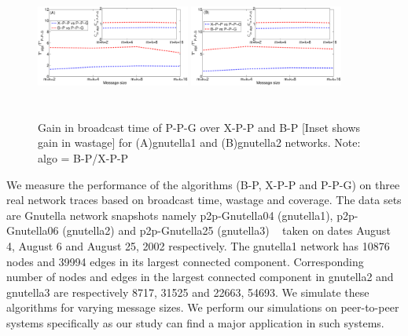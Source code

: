 \begin{figure}[!ht]
  \centering	
 \includegraphics*[width=0.45\textwidth,height=40mm,angle=0]{./texfiles/Chapter_3/netsci/figs1/comp_gnut_4.eps}
 \includegraphics*[width=0.45\textwidth,height=40mm,angle=0]{./texfiles/Chapter_3/netsci/figs1/comp_gnut_6.eps}
 
 \caption{\label{gnutellacomp1} Gain in broadcast time of P-P-G over X-P-P and B-P [Inset shows gain in wastage] for (A)gnutella1 and (B)gnutella2 networks. Note: algo = B-P/X-P-P }
\end{figure}
%  

We measure 
the performance of the algorithms (B-P, X-P-P and P-P-G) on three real network traces based on broadcast time, 
wastage and coverage. The data sets are Gnutella network snapshots namely 
p2p-Gnutella04 (gnutella1), p2p-Gnutella06 (gnutella2) and p2p-Gnutella25 (gnutella3) ~\cite{leskovec2007graph,ripeanu2002mapping} taken on dates August 4, August 6 and August 25, 2002 respectively. 
The gnutella1 network has 10876 nodes and 39994 edges in its largest connected component. Corresponding number of nodes and edges in the largest connected component 
in gnutella2 and gnutella3 are respectively 8717, 31525 and 22663, 54693. We simulate these algorithms for varying message sizes.
We perform our simulations on peer-to-peer systems specifically as our study can find a major application in such systems.


